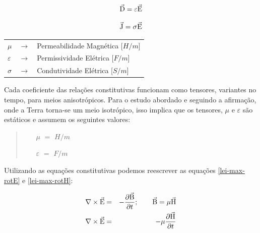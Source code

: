         \begin{equation}
         \vec{\textrm{D}} = \varepsilon \vec{\textrm{E}}
        \end{equation}
        
        \begin{equation}
         \vec{\textrm{J}} = \sigma \vec{\textrm{E}}
        \end{equation}

        {\footnotesize \noindent
            \begin{table}[H]
                \begin{tabular*}{1cm}{p{0.05cm}p{0.1cm}p{10cm}}
                    {\footnotesize $\mu$}          & {\footnotesize $\rightarrow$} & {\footnotesize Permeabilidade Magnética [$H/m$] }\\
                    {\footnotesize $\varepsilon$}  & {\footnotesize $\rightarrow$} & {\footnotesize Permissividade Elétrica [$F/m$] }\\
                    {\footnotesize $\sigma$}       & {\footnotesize $\rightarrow$} & {\footnotesize Condutividade Elétrica [$S/m$]} \\
                \end{tabular*}
            \end{table}}

        \noindent Cada coeficiente das relações constitutivas funcionam como tensores, variantes no tempo, para meios anisotrópicos. Para o estudo abordado e seguindo a afirmação, onde a Terra torna-se um meio isotrópico, isso implica que os tensores, $\mu$ e $\varepsilon$ são estáticos e assumem os seguintes valores:
        
        \begin{quote}
            \begin{enumerate}
                \item[$\mu$] $=$ $H/m$
                \item[$\varepsilon$] $=$ $F/m$
            \end{enumerate}
        \end{quote}
        
        Utilizando as equações constitutivas podemos reescrever as equações \ref{lei-max-rotE} e \ref{lei-max-rotH}:
        
        {\setlength\arraycolsep{2pt}
        \begin{eqnarray}
            \label{rotEconstH}
            \nabla \times \vec{\textrm{E}} &=& - \dfrac{\partial \vec{\textrm{B}}}{\partial t}; \qquad \vec{\textrm{B}} = \mu \vec{\textrm{H}} \nonumber \\
            \nabla \times \vec{\textrm{E}} &=& - \mu \dfrac{\partial \vec{\textrm{H}}}{\partial t}
        \end{eqnarray}}

